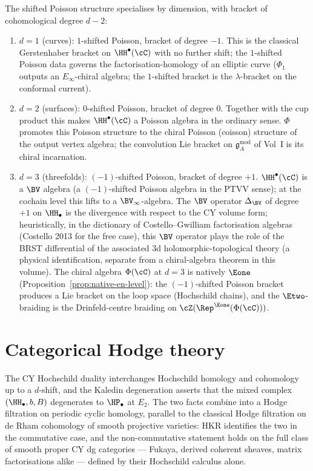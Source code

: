 \begin{remark}
\label{rem:three-dimensions}
The shifted Poisson structure specialises by dimension, with bracket of cohomological degree $d-2$:
\begin{enumerate}[label=(\alph*)]
 \item $d = 1$ (curves): $1$-shifted Poisson, bracket of degree $-1$. This is the classical Gerstenhaber bracket on $\HH^\bullet(\cC)$ with no further shift; the $1$-shifted Poisson data governs the factorisation-homology of an elliptic curve ($\Phi_1$ outputs an $E_\infty$-chiral algebra; the $1$-shifted bracket is the $\lambda$-bracket on the conformal current).
 \item $d = 2$ (surfaces): $0$-shifted Poisson, bracket of degree $0$. Together with the cup product this makes $\HH^\bullet(\cC)$ a Poisson algebra in the ordinary sense. $\Phi$ promotes this Poisson structure to the chiral Poisson (coisson) structure of the output vertex algebra; the convolution Lie bracket on $\mathfrak{g}^{\mathrm{mod}}_A$ of Vol~I is its chiral incarnation.
 \item $d = 3$ (threefolds): $(-1)$-shifted Poisson, bracket of degree $+1$. $\HH^\bullet(\cC)$ is a $\BV$ algebra (a $(-1)$-shifted Poisson algebra in the PTVV sense); at the cochain level this lifts to a $\BV_\infty$-algebra. The $\BV$ operator $\Delta_{\BV}$ of degree $+1$ on $\HH_\bullet$ is the divergence with respect to the CY volume form; heuristically, in the dictionary of Costello--Gwilliam factorisation algebras (Costello 2013 for the free case), this $\BV$ operator plays the role of the BRST differential of the associated 3d holomorphic-topological theory (a physical identification, separate from a chiral-algebra theorem in this volume). The chiral algebra $\Phi(\cC)$ at $d = 3$ is natively $\Eone$ (Proposition~\ref{prop:native-en-level}): the $(-1)$-shifted Poisson bracket produces a Lie bracket on the loop space (Hochschild chains), and the $\Etwo$-braiding is the Drinfeld-centre braiding on $\cZ(\Rep^{\Eone}(\Phi(\cC)))$.
\end{enumerate}
\end{remark}


\section{Categorical Hodge theory}
\label{sec:categorical-hodge}

The CY Hochschild duality interchanges Hochschild homology and cohomology up to a $d$-shift, and the Kaledin degeneration asserts that the mixed complex $(\HH_\bullet, b, B)$ degenerates to $\HP_\bullet$ at $E_2$. The two facts combine into a Hodge filtration on periodic cyclic homology, parallel to the classical Hodge filtration on de Rham cohomology of smooth projective varieties: HKR identifies the two in the commutative case, and the non-commutative statement holds on the full class of smooth proper CY dg categories — Fukaya, derived coherent sheaves, matrix factorisations alike — defined by their Hochschild calculus alone.

